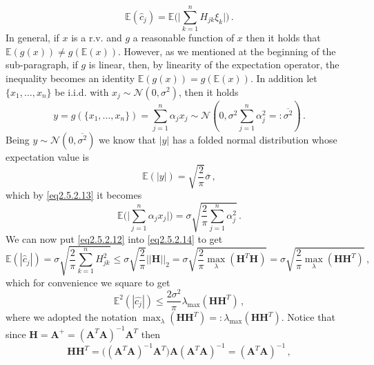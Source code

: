 \documentclass[../main.tex]{subfiles}
\begin{document}
\begin{equation}\label{eq2.5.2.12}
        \mathbb{E}(\hat{c}_{j}) = \mathbb{E}\Bigg(\Bigg|\sum_{k=1}^{n}H_{jk}\xi_{k}\Bigg|\Bigg)\,.
\end{equation}
In general, if $x$ is a r.v. and $g$ a reasonable function of $x$ then it holds that $\mathbb{E}(g(x))\neq g(\mathbb{E}(x))$.
However, as we mentioned at the beginning of the sub-paragraph, if $g$ is linear, then, by linearity of the expectation operator, the inequality becomes an identity $\mathbb{E}(g(x)) = g(\mathbb{E}(x))$.
In addition let $\{x_{1},\dots,x_{n}\}$ be i.i.d. with $x_{j}\sim \mathcal{N}(0,\sigma^{2})$, then it holds 
\begin{equation}\label{eq2.5.2.13}
        y = g(\{x_{1},\dots,x_{n}\}) = \sum_{j=1}^{n}\alpha_{j}x_{j}\sim \mathcal{N}(0,\sigma^{2}\sum_{j=1}^{n}\alpha_{j}^{2}=:\overline{\sigma^{2}})\,.
\end{equation}
Being $y\sim \mathcal{N}(0,\overline{\sigma^{2}})$ we know that $|y|$ has a folded normal distribution whose expectation value is
\begin{equation*}
        \mathbb{E}(|y|)=\sqrt{\frac{2}{\pi}}\overline{\sigma}\,,
\end{equation*}
which by \eqref{eq2.5.2.13} it becomes
\begin{equation}\label{eq2.5.2.14}
        \mathbb{E}\Bigg(\Bigg|\sum_{j=1}^{n}\alpha_{j}x_{j}\Bigg|\Bigg)=\sigma\sqrt{\frac{2}{\pi}\sum_{j=1}^{n}\alpha_{j}^{2}}\,.
\end{equation}
We can now put \eqref{eq2.5.2.12} into \eqref{eq2.5.2.14} to get
\begin{equation*}
        \mathbb{E}(|\hat{c}_{j}|) = \sigma\sqrt{\frac{2}{\pi}\sum_{k=1}^{n}H_{jk}^{2}}\leq\sigma\sqrt{\frac{2}{\pi}}||\boldsymbol{H}||_{2}=\sigma\sqrt{\frac{2}{\pi}\max_{\lambda}(\boldsymbol{H}^{T}\boldsymbol{H})}=\sigma\sqrt{\frac{2}{\pi}\max_{\lambda}(\boldsymbol{H}\boldsymbol{H}^{T})}\,,
\end{equation*}
which for convenience we square to get
\begin{equation}\label{eq2.5.2.15}
        \mathbb{E}^{2}(|\hat{c_{j}}|)\leq\frac{2\sigma^{2}}{\pi}\lambda_{\text{max}}(\boldsymbol{H}\boldsymbol{H}^{T})\,,
\end{equation}
where we adopted the notation $\max_{\lambda}(\boldsymbol{H}\boldsymbol{H}^{T})=:\lambda_{\text{max}}(\boldsymbol{H}\boldsymbol{H}^T)$.
Notice that since $\boldsymbol{H}=\boldsymbol{A}^{+}=(\boldsymbol{A}^{T}\boldsymbol{A})^{-1}\boldsymbol{A}^{T}$ then
\begin{equation*}
    \boldsymbol{H}\boldsymbol{H}^{T}=\bigg((\boldsymbol{A}^{T}\boldsymbol{A})^{-1}\boldsymbol{A}^{T}\bigg)\boldsymbol{A}(\boldsymbol{A}^{T}\boldsymbol{A})^{-1} = (\boldsymbol{A}^{T}\boldsymbol{A})^{-1}\,, 
\end{equation*}
\end{document}
